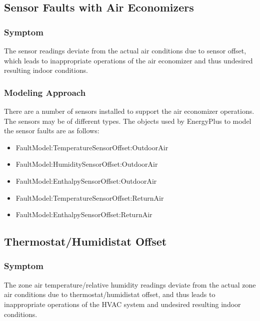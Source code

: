 \subsection{Sensor Faults with Air Economizers}\label{sensor-faults-with-air-economizers}

\subsubsection{Symptom}\label{symptom}

The sensor readings deviate from the actual air conditions due to sensor offset, which leads to inappropriate operations of the air economizer and thus undesired resulting indoor conditions.

\subsubsection{Modeling Approach}\label{modeling-approach}

There are a number of sensors installed to support the air economizer operations. The sensors may be of different types. The objects used by EnergyPlus to model the sensor faults are as follows:

\begin{itemize}
\tightlist
\item
  FaultModel:TemperatureSensorOffset:OutdoorAir
\item
  FaultModel:HumiditySensorOffset:OutdoorAir
\item
  FaultModel:EnthalpySensorOffset:OutdoorAir
\item
  FaultModel:TemperatureSensorOffset:ReturnAir
\item
  FaultModel:EnthalpySensorOffset:ReturnAir
\end{itemize}

\subsection{Thermostat/Humidistat Offset}\label{thermostathumidistat-offset}

\subsubsection{Symptom}\label{symptom-1}

The zone air temperature/relative humidity readings deviate from the actual zone air conditions due to thermostat/humidistat offset, and thus leads to inappropriate operations of the HVAC system and undesired resulting indoor conditions.

